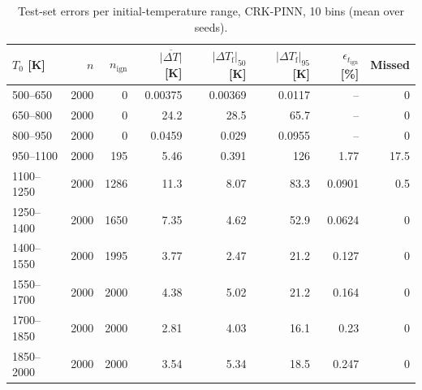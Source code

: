 \begin{table}[htbp]
    \centering
    \small
    \begin{tabular}{lrrrrrrr}
        \hline
        $T_0$ [K] & $n$ & $n_\mathrm{ign}$ & $\overline{|\Delta T|}$ [K] & $|\Delta T_\mathrm{f}|_{50}$ [K] & $|\Delta T_\mathrm{f}|_{95}$ [K] & $\epsilon_{t_\mathrm{ign}}$ [\%] & Missed \\
        \hline
        500--650 & 2000 & 0 & 0.00375 & 0.00369 & 0.0117 & -- & 0 \\
        650--800 & 2000 & 0 & 24.2 & 28.5 & 65.7 & -- & 0 \\
        800--950 & 2000 & 0 & 0.0459 & 0.029 & 0.0955 & -- & 0 \\
        950--1100 & 2000 & 195 & 5.46 & 0.391 & 126 & 1.77 & 17.5 \\
        1100--1250 & 2000 & 1286 & 11.3 & 8.07 & 83.3 & 0.0901 & 0.5 \\
        1250--1400 & 2000 & 1650 & 7.35 & 4.62 & 52.9 & 0.0624 & 0 \\
        1400--1550 & 2000 & 1995 & 3.77 & 2.47 & 21.2 & 0.127 & 0 \\
        1550--1700 & 2000 & 2000 & 4.38 & 5.02 & 21.2 & 0.164 & 0 \\
        1700--1850 & 2000 & 2000 & 2.81 & 4.03 & 16.1 & 0.23 & 0 \\
        1850--2000 & 2000 & 2000 & 3.54 & 5.34 & 18.5 & 0.247 & 0 \\
        \hline
    \end{tabular}
    \caption{Test-set errors per initial-temperature range, CRK-PINN, 10 bins (mean over seeds).}
    \label{tab:T0_crkpinn_predicted_b10_conv}
\end{table}

